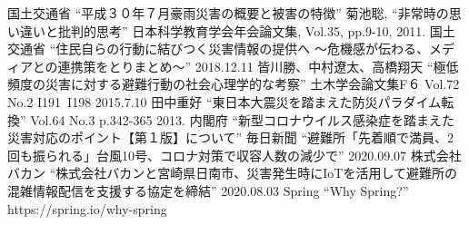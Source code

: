 \documentclass[technicalreport,dvipdfmx]{ieicej}
\begin{document}
%
%
\begin{thebibliography}{99}%
 国土交通省 “平成３０年７月豪雨災害の概要と被害の特徴”
 菊池聡, “非常時の思い違いと批判的思考” 日本科学教育学会年会論文集, Vol.35, pp.9-10, 2011.
 国土交通省 “住民自らの行動に結びつく災害情報の提供へ ～危機感が伝わる、メディアとの連携策をとりまとめ～” 2018.12.11
 皆川勝、中村遼太、高橋翔天 “極低頻度の災害に対する避難行動の社会心理学的な考察” 土木学会論文集F６ Vol.72 No.2 I191~I198 2015.7.10
 田中重好 “東日本大震災を踏まえた防災パラダイム転換” Vol.64 No.3 p.342-365 2013.
 内閣府 “新型コロナウイルス感染症を踏まえた災害対応のポイント【第１版】について”
 毎日新聞 “避難所「先着順で満員、2回も振られる」台風10号、コロナ対策で収容人数の減少で” 2020.09.07
 株式会社バカン “株式会社バカンと宮崎県日南市、災害発生時にIoTを活用して避難所の混雑情報配信を支援する協定を締結” 2020.08.03
 Spring “Why Spring?” https://spring.io/why-spring
\end{thebibliography}
\end{document}
